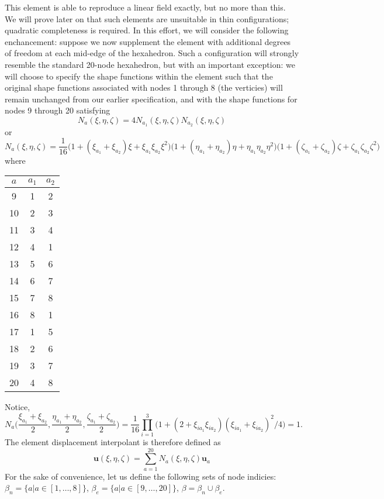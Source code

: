 \documentclass[11pt]{article} %
\begin{document}
This element is able to reproduce a linear field exactly, but no more than this. We will prove later on that such elements are unsuitable in thin configurations; quadratic completeness is required. In this effort, we will consider the following enchancement: suppose we now supplement the element with additional degrees of freedom at each mid-edge of the hexahedron. Such a configuration will strongly resemble the standard 20-node hexahedron, but with an important exception: we will choose to specify the shape functions within the element such that the original shape functions associated with nodes 1 through 8 (the verticies) will remain unchanged from our earlier specification, and with the shape functions for nodes 9 through 20 satisfying
\begin{equation}
	N_a (\xi, \eta, \zeta) = 4 N_{a_1} (\xi, \eta, \zeta) N_{a_2} (\xi, \eta, \zeta)
\end{equation}
or
\begin{equation}
	N_a (\xi, \eta, \zeta) = \frac{1}{16} \bigg( 1 + (\xi_{a_1} + \xi_{a_2}) \xi + \xi_{a_1} \xi_{a_2} \xi^2 \bigg) \bigg( 1 + (\eta_{a_1} + \eta_{a_2}) \eta + \eta_{a_1} \eta_{a_2} \eta^2 \bigg) \bigg( 1 + (\zeta_{a_1} + \zeta_{a_2}) \zeta + \zeta_{a_1} \zeta_{a_2} \zeta^2 \bigg)
\end{equation}
where
\begin{center}
\begin{tabular}{ ccc }
	$a$ & $a_1$ & $a_2$ \\
	\hline
	9 & 1 & 2 \\
	10 & 2 & 3 \\
	11 & 3 & 4 \\
	12 & 4 & 1 \\
	13 & 5 & 6 \\
	14 & 6 & 7 \\
	15 & 7 & 8 \\
	16 & 8 & 1 \\
	17 & 1 & 5 \\
	18 & 2 & 6 \\
	19 & 3 & 7 \\
	20 & 4 & 8
\end{tabular}
\end{center}
Notice,
\begin{equation}
	N_a \bigg( \frac{\xi_{a_1}+\xi_{a_2}}{2}, \frac{\eta_{a_1}+\eta_{a_2}}{2}, \frac{\zeta_{a_1}+\zeta_{a_2}}{2} \bigg) = \frac{1}{16} \prod_{i=1}^3 \bigg( 1 + (2 + \xi_{ia_1} \xi_{ia_2}) (\xi_{ia_1} + \xi_{ia_2})^2/4  \bigg) = 1.
\end{equation}
The element displacement interpolant is therefore defined as
\begin{equation}
	\mathbf{u}(\xi,\eta,\zeta) = \sum_{a = 1}^{20} N_a (\xi,\eta,\zeta) \mathbf{u}_a
\end{equation}
For the sake of convenience, let us define the following sets of node indicies: $\beta_n = \{ a | a \in [1,\ldots,8] \}$, $\beta_e = \{ a | a \in [9,\ldots,20] \}$, $\beta = \beta_n \cup \beta_e$.
\end{document}
